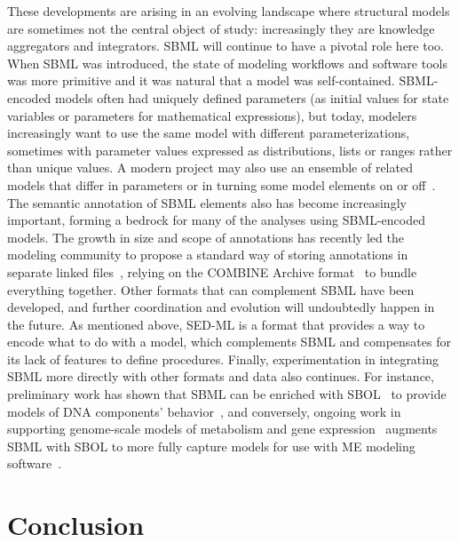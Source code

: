 \documentclass{sbml-paper}
\begin{document}
These developments are arising in an evolving landscape where structural models are sometimes not the central object of study: increasingly they are knowledge aggregators and integrators.  SBML will continue to have a pivotal role here too.  When SBML was introduced, the state of modeling workflows and software tools was more primitive and it was natural that a model was self-contained.  SBML-encoded models often had uniquely defined parameters (\eg as initial values for state variables or parameters for mathematical expressions), but today, modelers increasingly want to use the same model with different parameterizations, sometimes with parameter values expressed as distributions, lists or ranges rather than unique values.  A modern project may also use an ensemble of related models that differ in parameters or in turning some model elements on or off~\citep{kuepfer2007ensemble}.  The semantic annotation of SBML elements also has become increasingly important, forming a bedrock for many of the analyses using SBML-encoded models.  The growth in size and scope of annotations has recently led the modeling community to propose a standard way of storing annotations in separate linked files~\citep{Neal2019harmonizing}, relying on the COMBINE Archive format~\citep{bergmann2014combine} to bundle everything together.  Other formats that can complement SBML have been developed, and further coordination and evolution will undoubtedly happen in the future.  As mentioned above, SED-ML is a format that provides a way to encode what to do with a model, which complements SBML and compensates for its lack of features to define procedures.  Finally, experimentation in integrating SBML more directly with other formats and data also continues.  For instance, preliminary work has shown that SBML can be enriched with SBOL~\citep{voigt2018sbmlme} to provide models of DNA components' behavior~\citep{Roehner2014a}, and conversely, ongoing work in supporting genome-scale models of metabolism and gene expression~\citep[known as \emph{ME-models}, ][]{Thiele2012multiscale} augments SBML with SBOL to more fully capture models for use with ME modeling software~\citep{galdzicki_2014}.


\section*{Conclusion}
\end{document}
